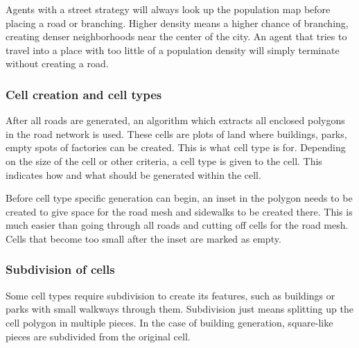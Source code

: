 Agents with a street strategy will always look up the population map before placing a road or branching.
Higher density means a higher chance of branching, creating denser neighborhoods near the center of the city.
An agent that tries to travel into a place with too little of a population density will simply terminate without creating a road.

\subsubsection{Cell creation and cell types}
After all roads are generated, an algorithm which extracts all enclosed polygons in the road network is used.
These cells are plots of land where buildings, parks, empty spots of factories can be created.
This is what cell type is for.
Depending on the size of the cell or other criteria, a cell type is given to the cell.
This indicates how and what should be generated within the cell.

Before cell type specific generation can begin, an inset in the polygon needs to be created to give space for the road mesh and sidewalks to be created there.
This is much easier than going through all roads and cutting off cells for the road mesh.
Cells that become too small after the inset are marked as empty.

\subsubsection{Subdivision of cells}
Some cell types require subdivision to create its features, such as buildings or parks with small walkways through them.
Subdivision just means splitting up the cell polygon in multiple pieces.
In the case of building generation, square-like pieces are subdivided from the original cell.
